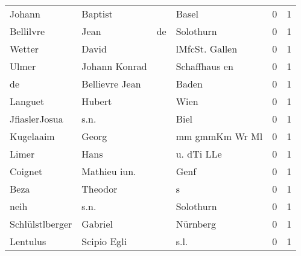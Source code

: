 \documentclass[10pt,a4paper,landscape]{article}
\begin{document}
\begin{longtable}{llllrr}
                   Johann &                            Baptist &             &                                       Basel &          0 &         1 \\
                Bellilvre &                               Jean &          de &                                   Solothurn &          0 &         1 \\
                   Wetter &                              David &             &                              lMfcSt. Gallen &          0 &         1 \\
                    Ulmer &                      Johann Konrad &             &                               Schaffhaus en &          0 &         1 \\
                       de &                     Bellievre Jean &             &                                       Baden &          0 &         1 \\
                  Languet &                             Hubert &             &                                        Wien &          0 &         1 \\
            JfiaslerJosua &                               s.n. &             &                                        Biel &          0 &         1 \\
                Kugelaaim &                              Georg &             &                              mm gmmKm Wr Ml &          0 &         1 \\
                    Limer &                               Hans &             &                                  u. dTi LLe &          0 &         1 \\
                  Coignet &                       Mathieu iun. &             &                                        Genf &          0 &         1 \\
                     Beza &                            Theodor &             &                                           s &          0 &         1 \\
                     neih &                               s.n. &             &                                   Solothurn &          0 &         1 \\
          Schlülstlberger &                            Gabriel &             &                                    Nürnberg &          0 &         1 \\
                 Lentulus &                        Scipio Egli &             &                                        s.l. &          0 &         1 \\

\end{longtable}
\end{document}
